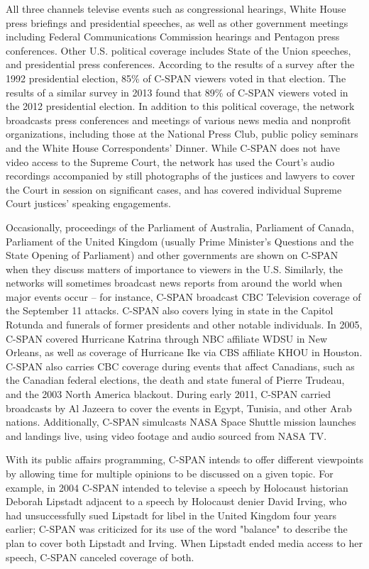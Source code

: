 All three channels televise events such as congressional hearings, White
House press briefings and presidential speeches, as well as other
government meetings including Federal Communications Commission hearings
and Pentagon press conferences. Other U.S. political coverage includes
State of the Union speeches, and presidential press conferences.
According to the results of a survey after the 1992 presidential
election, 85\% of C-SPAN viewers voted in that election. The results of
a similar survey in 2013 found that 89\% of C-SPAN viewers voted in the
2012 presidential election. In addition to this political coverage, the
network broadcasts press conferences and meetings of various news media
and nonprofit organizations, including those at the National Press Club,
public policy seminars and the White House Correspondents' Dinner. While
C-SPAN does not have video access to the Supreme Court, the network has
used the Court's audio recordings accompanied by still photographs of
the justices and lawyers to cover the Court in session on significant
cases, and has covered individual Supreme Court justices' speaking
engagements.

Occasionally, proceedings of the Parliament of Australia, Parliament of
Canada, Parliament of the United Kingdom (usually Prime Minister's
Questions and the State Opening of Parliament) and other governments are
shown on C-SPAN when they discuss matters of importance to viewers in
the U.S. Similarly, the networks will sometimes broadcast news reports
from around the world when major events occur -- for instance, C-SPAN
broadcast CBC Television coverage of the September 11 attacks. C-SPAN
also covers lying in state in the Capitol Rotunda and funerals of former
presidents and other notable individuals. In 2005, C-SPAN covered
Hurricane Katrina through NBC affiliate WDSU in New Orleans, as well as
coverage of Hurricane Ike via CBS affiliate KHOU in Houston. C-SPAN also
carries CBC coverage during events that affect Canadians, such as the
Canadian federal elections, the death and state funeral of Pierre
Trudeau, and the 2003 North America blackout. During early 2011, C-SPAN
carried broadcasts by Al Jazeera to cover the events in Egypt, Tunisia,
and other Arab nations. Additionally, C-SPAN simulcasts NASA Space
Shuttle mission launches and landings live, using video footage and
audio sourced from NASA TV.

With its public affairs programming, C-SPAN intends to offer different
viewpoints by allowing time for multiple opinions to be discussed on a
given topic. For example, in 2004 C-SPAN intended to televise a speech
by Holocaust historian Deborah Lipstadt adjacent to a speech by
Holocaust denier David Irving, who had unsuccessfully sued Lipstadt for
libel in the United Kingdom four years earlier; C-SPAN was criticized
for its use of the word "balance" to describe the plan to cover both
Lipstadt and Irving. When Lipstadt ended media access to her speech,
C-SPAN canceled coverage of both.

